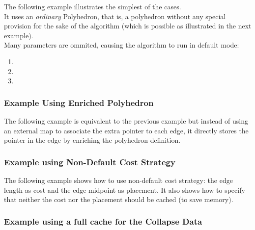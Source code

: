 The following example illustrates the simplest of the cases.\\
It uses an {\em ordinary} Polyhedron, that is, a polyhedron without any special provision 
for the sake of the algorithm (which is possible as illustrated in the next example).\\
Many parameters are ommited, causing the algorithm to run in default mode:

\begin{enumerate}
\item {}
\item {}
\item {}
\end{enumerate}


\subsubsection{Example Using Enriched Polyhedron}

The following example is equivalent to the previous example but instead of using an external map to associate the extra pointer to each edge, it directly stores the pointer in the edge by enriching the polyhedron definition.


\subsubsection{Example using Non-Default Cost Strategy}

The following example shows how to use non-default cost strategy: the edge length as cost and the edge
midpoint as placement. It also shows how to specify that neither the cost nor the placement should be cached (to save memory).


\subsubsection{Example using a full cache for the Collapse Data}

